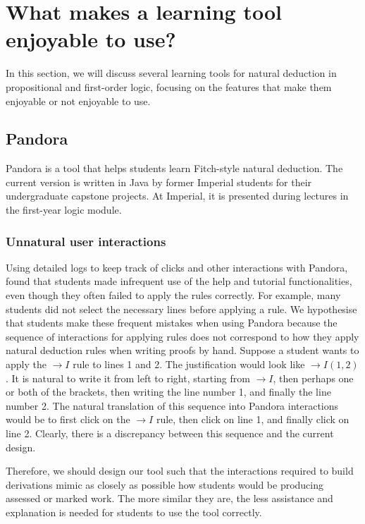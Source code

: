 
\section{What makes a learning tool enjoyable to use?}
\label{background:comparison}
In this section, we will discuss several learning tools for natural deduction in propositional and first-order logic, focusing on the features that make them enjoyable or not enjoyable to use.

\subsection{Pandora}
Pandora \cite{pandora:2007} is a tool that helps students learn Fitch-style \cite{fitch:1952} natural deduction. The current version \cite{pandora} is written in Java by former Imperial students for their undergraduate capstone projects. At Imperial, it is presented during lectures in the first-year logic module.

\subsubsection{Unnatural user interactions}
Using detailed logs to keep track of clicks and other interactions with Pandora, \cite{pandora:2007} found that students made infrequent use of the help and tutorial functionalities, even though they often failed to apply the rules correctly. For example, many students did not select the necessary lines before applying a rule. We hypothesise that students make these frequent mistakes when using Pandora because the sequence of interactions for applying rules does not correspond to how they apply natural deduction rules when writing proofs by hand. Suppose a student wants to apply the $\rightarrow I$ rule to lines 1 and 2. The justification would look like $\rightarrow I(1, 2)$. It is natural to write it from left to right, starting from $\rightarrow I$, then perhaps one or both of the brackets, then writing the line number 1, and finally the line number 2. The natural translation of this sequence into Pandora interactions would be to first click on the $\rightarrow I$ rule, then click on line 1, and finally click on line 2. Clearly, there is a discrepancy between this sequence and the current design.

Therefore, we should design our tool such that the interactions required to build derivations mimic as closely as possible how students would be producing assessed or marked work. The more similar they are, the less assistance and explanation is needed for students to use the tool correctly.

